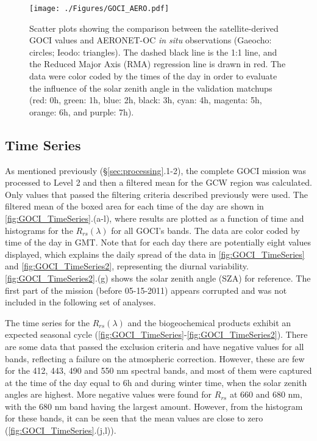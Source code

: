 \documentclass[onecolumn,3p,letterpaper,11pt]{elsarticle}
\begin{document}
\begin{figure}[H]
  \centering
    \texttt{[image: ./Figures/GOCI\_AERO.pdf]}

    \caption{Scatter plots showing the comparison between the satellite-derived GOCI values and AERONET-OC {\it in situ} observations (Gaeocho: circles; Ieodo: triangles). The dashed black line is the 1:1 line, and the Reduced Major Axis (RMA) regression line is drawn in red. The data were color coded by the times of the day in order to evaluate the influence of the solar zenith angle in the validation matchups (red: 0h, green: 1h, blue: 2h, black: 3h, cyan: 4h, magenta: 5h, orange: 6h, and purple: 7h). \label{fig:GOCI_AERO} } 
\end{figure}
\subsection{Time Series}\label{subsec:timeseries}
As mentioned previously (\S\ref{sec:processing}.1-2), the complete GOCI mission was processed to Level 2 and then a filtered mean for the GCW region was calculated. Only values that passed the filtering criteria described previously were used. The filtered mean of the boxed area for each time of the day are shown in \autoref{fig:GOCI_TimeSeries}.(a-l), where results are plotted as a function of time and histograms for the $R_{rs}(\lambda)$ for all GOCI's bands. The data are color coded by time of the day in GMT. Note that for each day there are potentially eight values displayed, which explains the daily spread of the data in \autoref{fig:GOCI_TimeSeries} and \autoref{fig:GOCI_TimeSeries2}, representing the diurnal variability. \autoref{fig:GOCI_TimeSeries2}.(g) shows the solar zenith angle (SZA) for reference. The first part of the mission (before 05-15-2011) appears corrupted and was not included in the following set of analyses.

The time series for the $R_{rs}(\lambda)$ and the biogeochemical products exhibit an expected seasonal cycle (\autoref{fig:GOCI_TimeSeries}-\ref{fig:GOCI_TimeSeries2}). 
There are some data that passed the exclusion criteria and have negative values for all bands, reflecting a failure on the atmospheric correction. However, these are few for the 412, 443, 490 and 550 nm spectral bands, and most of them were captured at the time of the day equal to 6h and during winter time, when the solar zenith angles are highest. More negative values were found for $R_{rs}$ at 660 and 680 nm, with the 680 nm band having the largest amount. However, from the histogram for these bands, it can be seen that the mean values are close to zero (\autoref{fig:GOCI_TimeSeries}.(j,l)). 
\end{document}
